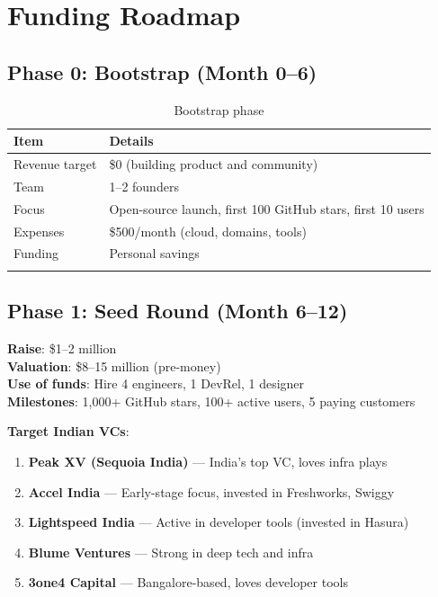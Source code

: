 \documentclass[12pt,a4paper,openany]{report}
\begin{document}
\chapter{Funding Roadmap}

\section{Phase 0: Bootstrap (Month 0--6)}

\begin{longtable}{p{4cm}p{9cm}}
\toprule
\textbf{Item} & \textbf{Details} \\
\midrule
Revenue target & \$0 (building product and community) \\
Team & 1--2 founders \\
Focus & Open-source launch, first 100 GitHub stars, first 10 users \\
Expenses & \$500/month (cloud, domains, tools) \\
Funding & Personal savings \\
\bottomrule
\caption{Bootstrap phase}
\end{longtable}

\section{Phase 1: Seed Round (Month 6--12)}

\begin{moneybox}
\textbf{Raise}: \$1--2 million\\
\textbf{Valuation}: \$8--15 million (pre-money)\\
\textbf{Use of funds}: Hire 4 engineers, 1 DevRel, 1 designer\\
\textbf{Milestones}: 1,000+ GitHub stars, 100+ active users, 5 paying customers
\end{moneybox}

\textbf{Target Indian VCs}:
\begin{enumerate}
    \item \textbf{Peak XV (Sequoia India)} — India's top VC, loves infra plays
    \item \textbf{Accel India} — Early-stage focus, invested in Freshworks, Swiggy
    \item \textbf{Lightspeed India} — Active in developer tools (invested in Hasura)
    \item \textbf{Blume Ventures} — Strong in deep tech and infra
    \item \textbf{3one4 Capital} — Bangalore-based, loves developer tools
\end{enumerate}
\end{document}
